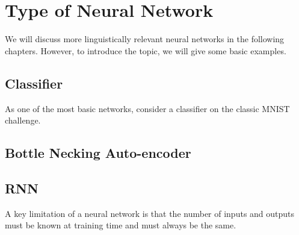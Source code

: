 \documentclass[12pt,parskip]{komatufte}
\begin{document}
\section{Type of Neural Network}
We will discuss more linguistically relevant neural networks in the following chapters.
However, to introduce the topic, we will give some basic examples.

\subsection{Classifier}
As one of the most basic networks, consider a classifier on the classic MNIST challenge.

\subsection{Bottle Necking Auto-encoder}

\subsection{RNN}
A key limitation of a neural network is that the number of inputs and outputs must be known at training time and must always be the same.

 
\end{document}
